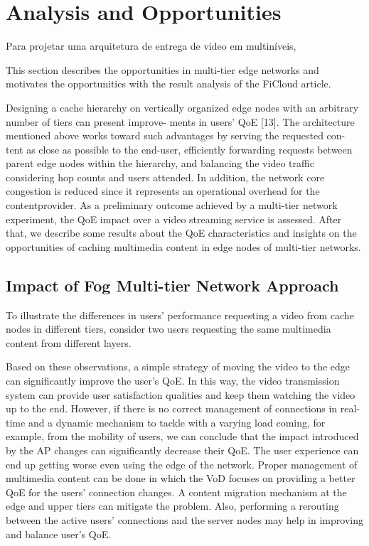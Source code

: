 \section{Analysis and Opportunities}
\label{sec:analysis_opportunities}

Para projetar uma arquitetura de entrega de video em multiníveis,

This section describes the opportunities in multi-tier edge networks and motivates the opportunities with the result analysis of the FiCloud article.

Designing a cache hierarchy on vertically organized edge
nodes with an arbitrary number of tiers can present improve-
ments in users’ QoE [13]. The architecture mentioned above
works toward such advantages by serving the requested con-
tent as close as possible to the end-user, efficiently forwarding
requests between parent edge nodes within the hierarchy, and
balancing the video traffic considering hop counts and users
attended. In addition, the network core congestion is reduced
since it represents an operational overhead for the contentprovider. As a preliminary outcome achieved by a multi-tier
network experiment, the QoE impact over a video streaming
service is assessed. After that, we describe some results about
the QoE characteristics and insights on the opportunities
of caching multimedia content in edge nodes of multi-tier
networks.


\subsection{Impact of Fog Multi-tier Network Approach}

To illustrate the differences in users’ performance requesting
a video from cache nodes in different tiers, consider two
users requesting the same multimedia content from different
layers.

Based on these observations, a simple strategy of moving
the video to the edge can significantly improve the user’s QoE.
In this way, the video transmission system can provide user
satisfaction qualities and keep them watching the video up
to the end. However, if there is no correct management of
connections in real-time and a dynamic mechanism to tackle
with a varying load coming, for example, from the mobility
of users, we can conclude that the impact introduced by the
AP changes can significantly decrease their QoE. The user
experience can end up getting worse even using the edge of
the network. Proper management of multimedia content can be
done in which the VoD focuses on providing a better QoE for
the users’ connection changes. A content migration mechanism
at the edge and upper tiers can mitigate the problem. Also,
performing a rerouting between the active users’ connections
and the server nodes may help in improving and balance user’s
QoE.